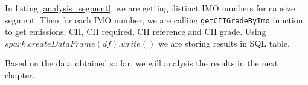 In listing \ref{analysis_segment}, we are getting distinct IMO numbers for capsize segment.
Then for each IMO number, we are calling \texttt{getCIIGradeByImo} function to get emissions, CII, CII required, CII reference and CII grade.
Using $spark.createDataFrame(df).write()$ we are storing results in SQL table.

Based on the data obtained so far, we will analysis the results in the next chapter.